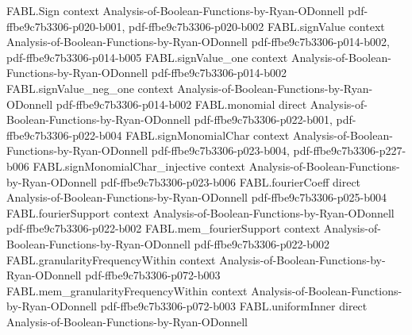 \begin{theorem}
\label{FABL.noiseSensitivity_inverse_dimension_le_of_totalInfluenceBound}
\leanok
{}
\proofstep
  {FABL.Sign}
  {context}
  {Analysis-of-Boolean-Functions-by-Ryan-ODonnell}
  {pdf-ffbe9c7b3306-p020-b001,
    pdf-ffbe9c7b3306-p020-b002}
\proofstep
  {FABL.signValue}
  {context}
  {Analysis-of-Boolean-Functions-by-Ryan-ODonnell}
  {pdf-ffbe9c7b3306-p014-b002,
    pdf-ffbe9c7b3306-p014-b005}
\proofstep
  {FABL.signValue_one}
  {context}
  {Analysis-of-Boolean-Functions-by-Ryan-ODonnell}
  {pdf-ffbe9c7b3306-p014-b002}
\proofstep
  {FABL.signValue_neg_one}
  {context}
  {Analysis-of-Boolean-Functions-by-Ryan-ODonnell}
  {pdf-ffbe9c7b3306-p014-b002}
\proofstep
  {FABL.monomial}
  {direct}
  {Analysis-of-Boolean-Functions-by-Ryan-ODonnell}
  {pdf-ffbe9c7b3306-p022-b001,
    pdf-ffbe9c7b3306-p022-b004}
\proofstep
  {FABL.signMonomialChar}
  {context}
  {Analysis-of-Boolean-Functions-by-Ryan-ODonnell}
  {pdf-ffbe9c7b3306-p023-b004,
    pdf-ffbe9c7b3306-p227-b006}
\proofstep
  {FABL.signMonomialChar_injective}
  {context}
  {Analysis-of-Boolean-Functions-by-Ryan-ODonnell}
  {pdf-ffbe9c7b3306-p023-b006}
\proofstep
  {FABL.fourierCoeff}
  {direct}
  {Analysis-of-Boolean-Functions-by-Ryan-ODonnell}
  {pdf-ffbe9c7b3306-p025-b004}
\proofstep
  {FABL.fourierSupport}
  {context}
  {Analysis-of-Boolean-Functions-by-Ryan-ODonnell}
  {pdf-ffbe9c7b3306-p022-b002}
\proofstep
  {FABL.mem_fourierSupport}
  {context}
  {Analysis-of-Boolean-Functions-by-Ryan-ODonnell}
  {pdf-ffbe9c7b3306-p022-b002}
\proofstep
  {FABL.granularityFrequencyWithin}
  {context}
  {Analysis-of-Boolean-Functions-by-Ryan-ODonnell}
  {pdf-ffbe9c7b3306-p072-b003}
\proofstep
  {FABL.mem_granularityFrequencyWithin}
  {context}
  {Analysis-of-Boolean-Functions-by-Ryan-ODonnell}
  {pdf-ffbe9c7b3306-p072-b003}
\proofstep
  {FABL.uniformInner}
  {direct}
  {Analysis-of-Boolean-Functions-by-Ryan-ODonnell}

\end{theorem}
